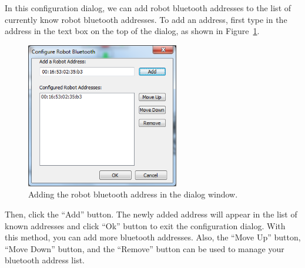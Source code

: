\documentclass[11pt]{article}
\begin{document}
In this configuration dialog, we can add robot bluetooth addresses to the list 
of currently know robot bluetooth addresses. To add an address, first type in 
the address in the text box on the top of the dialog, as shown in 
Figure~\ref{fig:add_address}.
\begin{figure}[H]
  \begin{center}
    \includegraphics[height=2.5in]{figure/configuration/addBTaddress.png}
    \caption{Adding the robot bluetooth address in the dialog window.\label{fig:add_address}}
  \end{center}
\end{figure}
Then, click the ``Add'' button. The newly added address will appear in the list 
of known addresses and click ``Ok'' button to exit the configuration dialog. With 
this method, you can add more bluetooth addresses. Also, the ``Move Up'' button, 
``Move Down'' button, and the ``Remove'' button can be used to manage your bluetooth 
address list.
\end{document}
